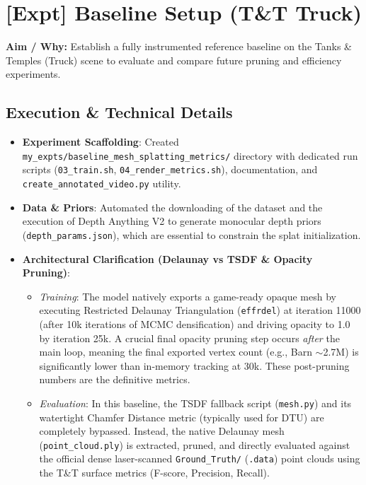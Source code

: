 \section[\textcolor{\statusSecFour}{[Expt] Baseline Setup (T\&T Truck)}]{\textcolor{\statusSecFour}{[Expt] Baseline Setup (T\&T Truck)}}

\begin{tcolorbox}[title={Status: [Baseline Established]}, colframe=\statusSecFour, colback=\statusSecFour!5]
\textbf{Aim / Why:} Establish a fully instrumented reference baseline on the Tanks \& Temples (Truck) scene to evaluate and compare future pruning and efficiency experiments.
\end{tcolorbox}

\subsection{Execution \& Technical Details}
\begin{itemize}
    \item \textbf{Experiment Scaffolding}: Created \texttt{my\_expts/baseline\_mesh\_splatting\_metrics/} directory with dedicated run scripts (\texttt{03\_train.sh}, \texttt{04\_render\_metrics.sh}), documentation, and \texttt{create\_annotated\_video.py} utility.
    \item \textbf{Data \& Priors}: Automated the downloading of the dataset and the execution of Depth Anything V2 to generate monocular depth priors (\texttt{depth\_params.json}), which are essential to constrain the splat initialization.
    \item \textbf{Architectural Clarification (Delaunay vs TSDF \& Opacity Pruning)}:
    \begin{itemize}
        \item \textit{Training}: The model natively exports a game-ready opaque mesh by executing Restricted Delaunay Triangulation (\texttt{effrdel}) at iteration 11000 (after 10k iterations of MCMC densification) and driving opacity to 1.0 by iteration 25k. A crucial final opacity pruning step occurs \textit{after} the main loop, meaning the final exported vertex count (e.g., Barn $\sim$2.7M) is significantly lower than in-memory tracking at 30k. These post-pruning numbers are the definitive metrics.
        \item \textit{Evaluation}: In this baseline, the TSDF fallback script (\texttt{mesh.py}) and its watertight Chamfer Distance metric (typically used for DTU) are completely bypassed. Instead, the native Delaunay mesh (\texttt{point\_cloud.ply}) is extracted, pruned, and directly evaluated against the official dense laser-scanned \texttt{Ground\_Truth/} (\texttt{.data}) point clouds using the T\&T surface metrics (F-score, Precision, Recall).
    \end{itemize}
\end{itemize}

